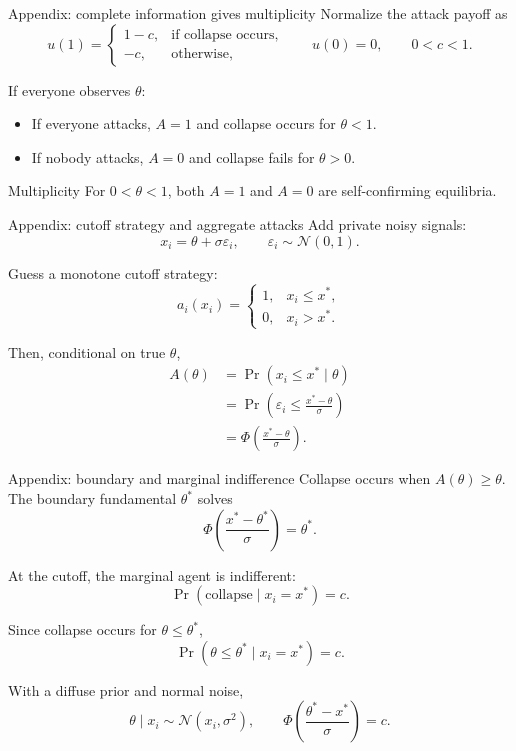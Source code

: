 \documentclass[aspectratio=169,12pt]{beamer}
\begin{document}
\begin{frame}{Appendix: complete information gives multiplicity}
  \small
  Normalize the attack payoff as
  \[
    u(1)=
    \begin{cases}
    1-c, & \text{if collapse occurs},\\
    -c, & \text{otherwise},
    \end{cases}
    \qquad u(0)=0,
    \qquad 0<c<1.
  \]

  \vspace{-0.1cm}
  If everyone observes $\theta$:
  \begin{itemize}\setlength\itemsep{0.25em}
    \item If everyone attacks, $A=1$ and collapse occurs for $\theta<1$.
    \item If nobody attacks, $A=0$ and collapse fails for $\theta>0$.
  \end{itemize}

  \smallskip
  \begin{block}{Multiplicity}
    For $0<\theta<1$, both $A=1$ and $A=0$ are self-confirming equilibria.
  \end{block}
\end{frame}

\begin{frame}{Appendix: cutoff strategy and aggregate attacks}
  \small
  Add private noisy signals:
  \[
    x_i=\theta+\sigma\varepsilon_i,
    \qquad \varepsilon_i\sim\mathcal N(0,1).
  \]

  Guess a monotone cutoff strategy:
  \[
    a_i(x_i)=
    \begin{cases}
    1, & x_i\le x^*,\\
    0, & x_i>x^*.
    \end{cases}
  \]

  Then, conditional on true $\theta$,
  \begin{align*}
    A(\theta)
    &=\Pr(x_i\le x^*\mid\theta)\\
    &=\Pr\left(\varepsilon_i\le \frac{x^*-\theta}{\sigma}\right)\\
    &=\Phi\left(\frac{x^*-\theta}{\sigma}\right).
  \end{align*}
\end{frame}

\begin{frame}{Appendix: boundary and marginal indifference}
  \small
  Collapse occurs when $A(\theta)\ge\theta$. The boundary fundamental $\theta^*$ solves
  \[
    \Phi\left(\frac{x^*-\theta^*}{\sigma}\right)=\theta^*.
  \]

  \smallskip
  At the cutoff, the marginal agent is indifferent:
  \[
    \Pr(\text{collapse}\mid x_i=x^*)=c.
  \]

  Since collapse occurs for $\theta\le\theta^*$,
  \[
    \Pr(\theta\le\theta^*\mid x_i=x^*)=c.
  \]

  With a diffuse prior and normal noise,
  \[
    \theta\mid x_i\sim\mathcal N(x_i,\sigma^2),
    \qquad
    \Phi\left(\frac{\theta^*-x^*}{\sigma}\right)=c.
  \]
\end{frame}
\end{document}
